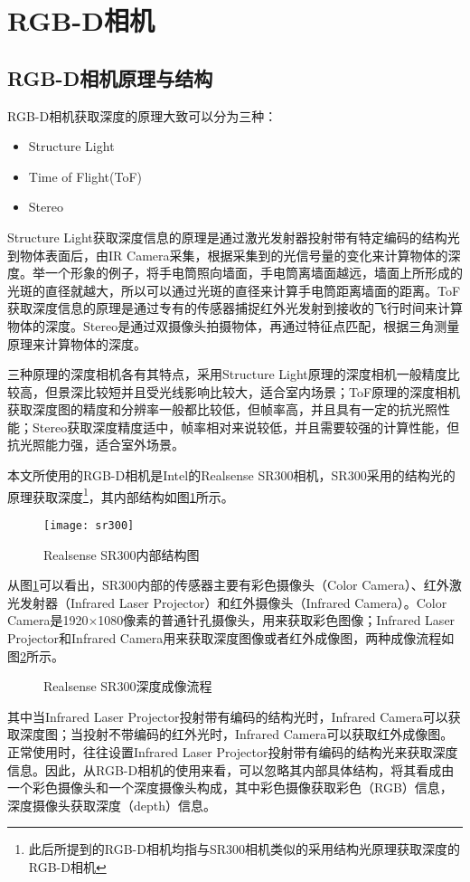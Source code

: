 \section{RGB-D相机}
\subsection{RGB-D相机原理与结构}
RGB-D相机获取深度的原理大致可以分为三种：
\begin{itemize}
\item Structure Light
\item Time of Flight(ToF)
\item Stereo
\end{itemize}

Structure Light获取深度信息的原理是通过激光发射器投射带有特定编码的结构光到物体表面后，由IR Camera采集，根据采集到的光信号量的变化来计算物体的深度。举一个形象的例子，将手电筒照向墙面，手电筒离墙面越远，墙面上所形成的光斑的直径就越大，所以可以通过光斑的直径来计算手电筒距离墙面的距离。ToF获取深度信息的原理是通过专有的传感器捕捉红外光发射到接收的飞行时间来计算物体的深度。Stereo是通过双摄像头拍摄物体，再通过特征点匹配，根据三角测量原理来计算物体的深度。

三种原理的深度相机各有其特点，采用Structure Light原理的深度相机一般精度比较高，但景深比较短并且受光线影响比较大，适合室内场景；ToF原理的深度相机获取深度图的精度和分辨率一般都比较低，但帧率高，并且具有一定的抗光照性能；Stereo获取深度精度适中，帧率相对来说较低，并且需要较强的计算性能，但抗光照能力强，适合室外场景。

本文所使用的RGB-D相机是Intel的Realsense SR300相机，SR300采用的结构光的原理获取深度\footnote{此后所提到的RGB-D相机均指与SR300相机类似的采用结构光原理获取深度的RGB-D相机}，其内部结构如图\ref{fig:sr300}所示。
\begin{figure}[!ht]
  \centering
  \texttt{[image: sr300]}
  \caption{Realsense SR300内部结构图}
  \label{fig:sr300}
\end{figure}
从图\ref{fig:sr300}可以看出，SR300内部的传感器主要有彩色摄像头（Color Camera）、红外激光发射器（Infrared Laser Projector）和红外摄像头（Infrared Camera）。Color Camera是1920×1080像素的普通针孔摄像头，用来获取彩色图像；Infrared Laser Projector和Infrared Camera用来获取深度图像或者红外成像图，两种成像流程如图\ref{fig:capture_flow}所示。
\begin{figure}[!ht]
  \centering
  \vfill
  \caption{Realsense SR300深度成像流程}
  \label{fig:capture_flow}
\end{figure}
其中当Infrared Laser Projector投射带有编码的结构光时，Infrared Camera可以获取深度图；当投射不带编码的红外光时，Infrared Camera可以获取红外成像图。正常使用时，往往设置Infrared Laser Projector投射带有编码的结构光来获取深度信息。因此，从RGB-D相机的使用来看，可以忽略其内部具体结构，将其看成由一个彩色摄像头和一个深度摄像头构成，其中彩色摄像获取彩色（RGB）信息，深度摄像头获取深度（depth）信息。

